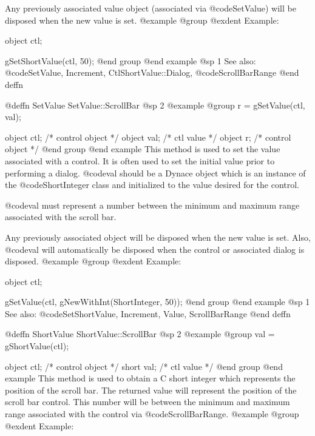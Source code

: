{Any previously associated value object (associated via @code{SetValue})
will be disposed when the new value is set.
@example
@group
@exdent Example:

object  ctl;

gSetShortValue(ctl, 50);
@end group
@end example
@sp 1
See also:  @code{SetValue, Increment, CtlShortValue::Dialog,}
        @code{ScrollBarRange}
@end deffn













@deffn {SetValue} SetValue::ScrollBar
@sp 2
@example
@group
r = gSetValue(ctl, val);

object  ctl;    /*  control object  */
object  val;    /*  ctl value       */
object  r;      /*  control object  */
@end group
@end example
This method is used to set the value associated with a control.  It is
often used to set the initial value prior to performing a dialog.
@code{val} should be a Dynace object which is an instance of the
@code{ShortInteger} class and initialized to the value desired for the
control.

@code{val} must represent a number between the minimum and maximum range
associated with the scroll bar.

Any previously associated object will be disposed when the new value is set.
Also, @code{val} will automatically be disposed when the control or associated
dialog is disposed.
@example
@group
@exdent Example:

object  ctl;

gSetValue(ctl, gNewWithInt(ShortInteger, 50));
@end group
@end example
@sp 1
See also:  @code{SetShortValue, Increment, Value, ScrollBarRange}
@end deffn













@deffn {ShortValue} ShortValue::ScrollBar
@sp 2
@example
@group
val = gShortValue(ctl);

object  ctl;   /*  control object  */
short   val;   /*  ctl value       */
@end group
@end example
This method is used to obtain a C short integer which represents the
position of the scroll bar.  The returned value will represent the
position of the scroll bar control.  This number will be between the
minimum and maximum range associated with the control via
@code{ScrollBarRange}.
@example
@group
@exdent Example:

}
